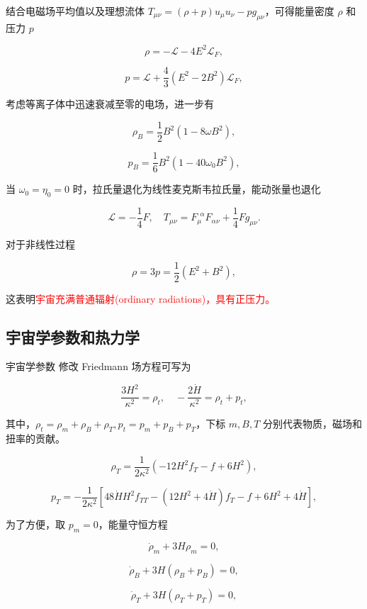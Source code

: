 \documentclass[9pt, dvipsnames]{beamer} %
\begin{document}
\begin{frame}
    结合电磁场平均值以及理想流体 $T_{\mu\nu}=(\rho+p)u_\mu u_\nu-p g_{\mu\nu}$，可得能量密度 $\rho$ 和压力 $p$

    $$
    \rho = -\mathcal{L} - 4E^2 \mathcal{L}_F,
    $$

    $$
    p = \mathcal{L} + \frac{4 }{3 } \left(E^2-2B^2 \right)\mathcal{L}_F,
    $$

    考虑等离子体中迅速衰减至零的电场，进一步有

    $$
    \rho_B = \frac{1 }{2 } B^2\left(1-8\omega B^2 \right),
    $$


    $$
    p_B = \frac{1 }{6 } B^2 \left(1-40\omega_0 B^2 \right),
    $$

    当 $\omega_0=\eta_0=0$ 时，拉氏量退化为线性麦克斯韦拉氏量，能动张量也退化

    $$
    \mathcal{L} = -\frac{1 }{4 } F,\quad
    T_{\mu\nu} = F_\mu^{~~\alpha} F_{\alpha\nu} + \frac{1 }{4 } F g_{\mu\nu}.
    $$

    对于非线性过程

    $$
    \rho = 3p = \frac{1 }{2 } \left(E^2 + B^2 \right),
    $$

    这表明\textcolor{red}{宇宙充满普通辐射(ordinary radiations)，具有正压力。}

\end{frame}

\subsection{宇宙学参数和热力学}

\begin{frame}{宇宙学参数}
    修改 Friedmann 场方程可写为

    $$
    \frac{3 H^2 }{\kappa^2 } = \rho_t,\quad
    -\frac{2\dot{H} }{\kappa^2 }  = \rho_t + p_t,
    $$
    
    其中，$\rho_t=\rho_m+\rho_B+\rho_T,p_t=p_m+p_B+p_T$，下标 $m,B,T$ 分别代表物质，磁场和扭率的贡献。

    $$
    \rho_T = \frac{1 }{2\kappa^2 } \left(-12 H^2 f_T - f + 6H^2 \right),
    $$

    $$
    p_T = -\frac{1 }{2\kappa^2 } \left[48\dot{H}H^2 f_{TT} - \left(12 H^2 + 4\dot{H} \right) f_T - f + 6 H^2 + 4\dot{H} \right],
    $$

    为了方便，取 $p_m=0$，能量守恒方程

    $$
    \dot{\rho}_m + 3H \rho_m = 0,
    $$

    $$
    \dot{\rho}_B + 3H\left(\rho_B + p_B \right) = 0,
    $$

    $$
    \dot{\rho}_T + 3H\left(\rho_T + p_T \right) = 0,
    $$

\end{frame}
\end{document}
